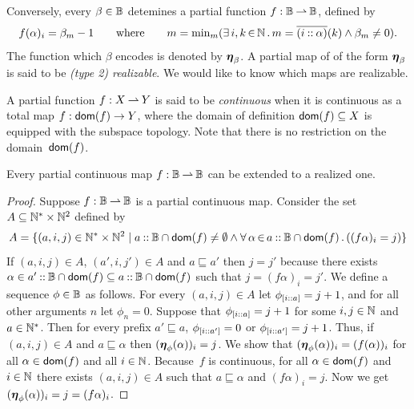 Conversely, every $\beta \in \mathbb{B}$ detemines a partial function $f :
\mathbb{B} \mathbin{\rightharpoonup} \mathbb{B}$, defined by
%
\begin{equation}
  \label{eq:type2-encoding}
  f(\alpha)_i = \beta_m - 1
  \qquad\text{where}\qquad
  m = \min\nolimits_m (\exists\, i,k \,{\in}\, \mathbb{N}\,.\,m = \overline{(i \mathbin{{:}{:}} \alpha)}(k) \land
    \beta_m \neq 0).
\end{equation}
%
The function which $\beta$ encodes is denoted by $\text{\boldmath{$\eta$}}_\beta$. A
partial map of of the form $\text{\boldmath{$\eta$}}_\beta$ is said to be \emph{(type 2)
  realizable}. We would like to know which maps are realizable.

A partial function $f: X \mathbin{\rightharpoonup} Y$ is said to be \emph{continuous}
when it is continuous as a total map $f: \mathsf{dom}(f) \to Y$, where the
domain of definition $\mathsf{dom}(f) \subseteq X$ is equipped with the
subspace topology. Note that there is no restriction on the
domain~$\mathsf{dom}(f)$.

\begin{theorem}
  \label{th:extension_BB}%
  Every partial continuous map $f: \mathbb{B} \mathbin{\rightharpoonup} \mathbb{B}$ can be extended
  to a realized one.
\end{theorem}

\begin{proof}
  Suppose $f: \mathbb{B} \mathbin{\rightharpoonup} \mathbb{B}$ is a partial continuous map.  Consider
  the set $A \subseteq \mathbb{N}^{*} \times \mathbb{N}^2$ defined by
  \begin{equation*}
     A = \{(a, i, j) \in \mathbb{N}^{*} \times \mathbb{N}^{2} \mid
        a \mathbin{{:}{:}} \mathbb{B} \cap \mathsf{dom}(f) \neq \emptyset \land
        \forall\, \alpha \,{\in}\, a \mathbin{{:}{:}} \mathbb{B} \cap \mathsf{dom}(f)\,.\left(
          (f\alpha)_i = j
          \right)
        \}
  \end{equation*}
  If $(a, i, j) \in A$, $(a', i, j') \in A$ and $a \sqsubseteq a'$
  then $j = j'$ because there exists $\alpha \in a' \mathbin{{:}{:}} \mathbb{B}
  \cap \mathsf{dom}(f) \subseteq a \mathbin{{:}{:}} \mathbb{B} \cap \mathsf{dom}(f)$ such that $j =
  (f \alpha)_i = j'$. We define a sequence $\phi \in \mathbb{B}$ as
  follows. For every $(a, i, j) \in A$ let $\phi_{[i \mathbin{{:}{:}} a]} =
  j + 1$, and for all other arguments $n$ let $\phi_n = 0$. Suppose
  that $\phi_{[i \mathbin{{:}{:}} a]} = j + 1$ for some $i, j \in \mathbb{N}$ and
  $a \in \mathbb{N}^{*}$. Then for every prefix $a' \sqsubseteq a$,
  $\phi_{[i \mathbin{{:}{:}} a']} = 0$ or $\phi_{[i \mathbin{{:}{:}} a']} = j +
  1$. Thus, if $(a, i, j) \in A$ and $a \sqsubseteq \alpha$ then
  $(\text{\boldmath{$\eta$}}_{\phi}(\alpha))_i = j$.
  We show that $(\text{\boldmath{$\eta$}}_{\phi}(\alpha))_i = (f(\alpha))_i$ for all
  $\alpha \in \mathsf{dom}(f)$ and all $i \in \mathbb{N}$. Because~$f$ is continuous,
  for all $\alpha \in \mathsf{dom}(f)$ and $i \in \mathbb{N}$ there exists $(a, i, j)
  \in A$ such that $a \sqsubseteq \alpha$ and $(f \alpha)_i = j$. Now
  we get
  $
    (\text{\boldmath{$\eta$}}_{\phi}(\alpha))_i
    = j
    = (f \alpha)_i
  $.
\end{proof}

